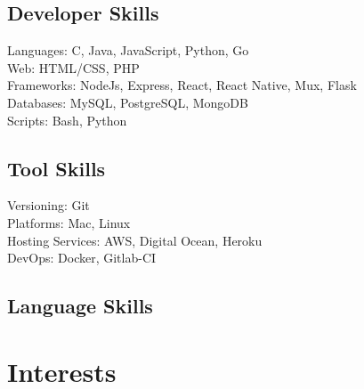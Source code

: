 \documentclass[a4paper]{deedy-resume} %
\begin{document}
\begin{minipage}[t]{0.55\textwidth}

\subsection{Developer Skills}

\textbullet{} Languages: C, Java, JavaScript, Python, Go \\
\textbullet{} Web: HTML/CSS, PHP \\
\textbullet{} Frameworks: NodeJs, Express, React, React Native, Mux, Flask \\
\textbullet{} Databases: MySQL, PostgreSQL, MongoDB  \\
\textbullet{} Scripts: Bash, Python\\

\end{minipage}
\begin{minipage}[t]{0.39\textwidth}

\subsection{Tool Skills}

\textbullet{} Versioning: Git \\
\textbullet{} Platforms: Mac, Linux \\
\textbullet{} Hosting Services: AWS, Digital Ocean, Heroku \\
\textbullet{} DevOps: Docker, Gitlab-CI \\

\end{minipage}
\begin{minipage}[t]{0.29\textwidth}

\insectionspace 

\subsection{Language Skills}


\end{minipage}

\sectionspace %
\sectionspace %



\section{Interests}
\end{document}
